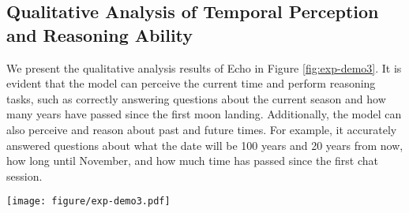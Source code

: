 \subsection{Qualitative Analysis of Temporal Perception and Reasoning Ability}

We present the qualitative analysis results of Echo in Figure \ref{fig:exp-demo3}. It is evident that the model can perceive the current time and perform reasoning tasks, such as correctly answering questions about the current season and how many years have passed since the first moon landing. Additionally, the model can also perceive and reason about past and future times. For example, it accurately answered questions about what the date will be 100 years and 20 years from now, how long until November, and how much time has passed since the first chat session.

\begin{figure*}[h]
\centering

\texttt{[image: figure/exp-demo3.pdf]} \\

\caption{Examples of time perception and reasoning ability in the Echo.}
\label{fig:exp-demo3}
\end{figure*}



